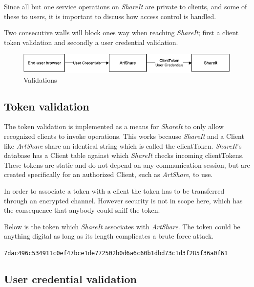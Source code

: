 \documentclass[../report.tex]{subfiles}
\begin{document}
\graphicspath{{img/}{../img/}}


Since all but one service operations on \textit{ShareIt} are private to clients, and some of these to users, it is important to discuss how access control is handled.

Two consecutive walls will block ones way when reaching \textit{ShareIt}; first a client token validation and secondly a user credential validation. \\


\begin{figure}[H]
\includegraphics[width=\linewidth]{./AccessControlDeployment.pdf}
\caption{Validations}
\label{fig:validations}
\end{figure}


\subsection{Token validation}
\label{sec:Token}

The token validation is implemented as a means for \textit{ShareIt} to only allow recognized clients to invoke operations. This works because \textit{ShareIt} and a Client like \textit{ArtShare} share an identical string which is called the clientToken. \textit{ShareIt}'s database has a Client table against which \textit{ShareIt} checks incoming clientTokens. These tokens are static and do not depend on any communication session, but are created specifically for an authorized Client, such as \textit{ArtShare}, to use.

In order to associate a token with a client the token has to be transferred through an encrypted channel. However security is not in scope here, which has the consequence that anybody could sniff the token.

Below is the token which \textit{ShareIt} associates with \textit{ArtShare}. The token could be anything digital as long as its length complicates a brute force attack.

\begin{center}
\texttt{7dac496c534911c0ef47bce1de772502b0d6a6c60b1dbd73c1d3f285f36a0f61}
\end{center}



\subsection{User credential validation}
\label{sec:UserCredential}
\end{document}
